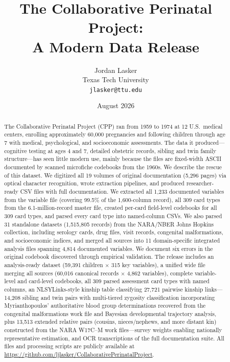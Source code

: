 \documentclass[12pt]{article}
\title{The Collaborative Perinatal Project:\\ A Modern Data Release}
\author{Jordan Lasker\\[4pt]\small Texas Tech University\\[-1pt]\small \texttt{jlasker@ttu.edu}}
\date{August 2026}
\begin{document}
\maketitle

\begin{abstract}
The Collaborative Perinatal Project (CPP) ran from 1959 to 1974 at 12 U.S.\ medical centers, enrolling approximately 60,000 pregnancies and following children through age 7 with medical, psychological, and socioeconomic assessments. The data it produced---cognitive testing at ages 4 and 7, detailed obstetric records, sibling and twin family structure---has seen little modern use, mainly because the files are fixed-width ASCII documented by scanned microfiche codebooks from the 1960s. We describe the rescue of this dataset. We digitized all 19 volumes of original documentation (5,296 pages) via optical character recognition, wrote extraction pipelines, and produced researcher-ready CSV files with full documentation. We extracted all 1,233 documented variables from the variable file (covering 99.5\% of the 1,600-column record), all 309 card types from the 6.1-million-record master file, created per-card field-level codebooks for all 309 card types, and parsed every card type into named-column CSVs. We also parsed 31 standalone datasets (1,515,805 records) from the NARA/NBER Johns Hopkins collection, including serology cards, drug files, visit records, congenital malformations, and socioeconomic indices, and merged all sources into 11 domain-specific integrated analysis files spanning 4,814 documented variables. We document six errors in the original codebook discovered through empirical validation. The release includes an analysis-ready dataset (59,391 children $\times$ 315 key variables), a unified wide file merging all sources (60,016 canonical records $\times$ 4,862 variables), complete variable-level and card-level codebooks, all 309 parsed assessment card types with named columns, an NLSYLinks-style kinship table classifying 27,721 pairwise kinship links---14,208 sibling and twin pairs with multi-tiered zygosity classification incorporating Myrianthopoulos' authoritative blood group determinations recovered from the congenital malformations work file and Bayesian developmental trajectory analysis, plus 13,513 extended relative pairs (cousins, nieces/nephews, and more distant kin) constructed from the NARA W17C--M work files---survey weights enabling nationally representative estimation, and OCR transcriptions of the full documentation suite. All files and processing scripts are publicly available at \url{https://github.com/ljlasker/CollaborativePerinatalProject}.
\end{abstract}
\end{document}
